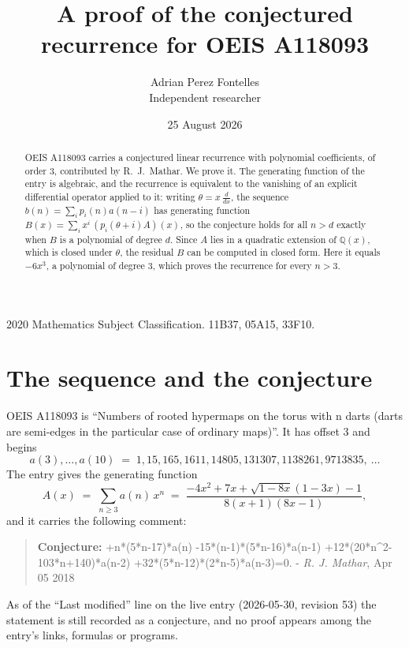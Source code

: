\documentclass[11pt,a4paper]{article}
\title{A proof of the conjectured recurrence for OEIS A118093}
\author{Adrian Perez Fontelles\\ \small Independent researcher}
\date{25 August 2026}
\theoremstyle{plain}
\theoremstyle{definition}
\begin{document}
\maketitle

\begin{abstract}
OEIS A118093 carries a conjectured linear recurrence with polynomial coefficients, of
order 3, contributed by R.~J.~Mathar. We prove it. The generating function of the
entry is algebraic, and the recurrence is equivalent to the vanishing of an explicit
differential operator applied to it: writing $\theta=x\,\frac{d}{dx}$, the sequence
$b(n)=\sum_{i}p_{i}(n)a(n-i)$ has generating function
$B(x)=\sum_{i}x^{i}\,(p_{i}(\theta+i)A)(x)$, so the conjecture holds for all $n>d$ exactly
when $B$ is a polynomial of degree $d$. Since $A$ lies in a quadratic extension of
$\mathbb{Q}(x)$, which is closed under $\theta$, the residual $B$ can be computed in
closed form. Here it equals $- 6 x^{3}$, a polynomial of degree $3$, which proves
the recurrence for every $n>3$.
\end{abstract}

\noindent\small 2020 Mathematics Subject Classification. 11B37, 05A15, 33F10.\normalsize

\section{The sequence and the conjecture}

OEIS A118093 is ``Numbers of rooted hypermaps on the torus with n darts (darts are semi-edges in the particular case of ordinary maps)''. It has offset $3$ and begins
\[
a(3),\dots,a(10)\;=\;1, 15, 165, 1611, 14805, 131307, 1138261, 9713835,\ \dots
\]
The entry gives the generating function
\begin{equation}\label{eq:gf}
A(x)\;=\;\sum_{n\ge 3} a(n)\,x^{n}\;=\;\frac{- 4 x^{2} + 7 x + \sqrt{1 - 8 x} \left(1 - 3 x\right) - 1}{8 \left(x + 1\right) \left(8 x - 1\right)} ,
\end{equation}
and it carries the following comment:
\begin{quote}\small
\textbf{Conjecture:} +n*(5*n-17)*a(n) -15*(n-1)*(5*n-16)*a(n-1) +12*(20*n\^{}2-103*n+140)*a(n-2) +32*(5*n-12)*(2*n-5)*a(n-3)=0. - \emph{R. J. Mathar}, Apr 05 2018
\end{quote}
As of the ``Last modified'' line on the live entry (2026-05-30, revision 53) the
statement is still recorded as a conjecture, and no proof appears among the entry's links,
formulas or programs.
\end{document}

